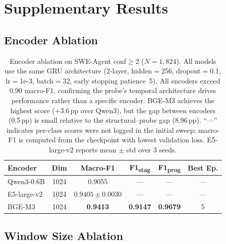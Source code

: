 \section{Supplementary Results}
\label{sec:appendix}

\subsection{Encoder Ablation}
\label{sec:app_encoder}

\begin{table}[h]
\centering
\small
\begin{tabular}{lccccc}
\toprule
\textbf{Encoder} & \textbf{Dim} & \textbf{Macro-F1} & \textbf{F1\textsubscript{stag}} & \textbf{F1\textsubscript{prog}} & \textbf{Best Ep.} \\
\midrule
Qwen3-0.6B & 1024 & 0.9055 & --- & --- & --- \\
E5-large-v2 & 1024 & $0.9405 \pm 0.0030$ & --- & --- & --- \\
BGE-M3 & 1024 & \textbf{0.9413} & \textbf{0.9147} & \textbf{0.9679} & 5 \\
\bottomrule
\end{tabular}
\caption{Encoder ablation on SWE-Agent conf${\geq}$2 ($N{=}1{,}824$). All models use the same GRU architecture (2-layer, hidden$=$256, dropout$=$0.1, lr$=$1e-3, batch$=$32, early stopping patience~5). All encoders exceed 0.90 macro-F1, confirming the probe's temporal architecture drives performance rather than a specific encoder. BGE-M3 achieves the highest score ($+$3.6\,pp over Qwen3), but the gap between encoders (0.5\,pp) is small relative to the structural--probe gap (8.96\,pp). ``---'' indicates per-class scores were not logged in the initial sweep; macro-F1 is computed from the checkpoint with lowest validation loss. E5-large-v2 reports mean $\pm$ std over 3 seeds.}
\label{tab:encoder_ablation}
\end{table}

\subsection{Window Size Ablation}
\label{sec:app_window}

